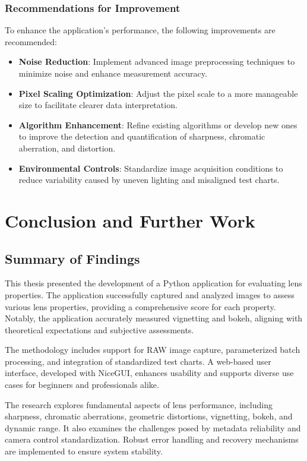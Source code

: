 \subsection{Recommendations for Improvement}
To enhance the application's performance, the following improvements are recommended:

\begin{itemize}
    \item \textbf{Noise Reduction}: Implement advanced image preprocessing techniques to minimize noise and enhance measurement accuracy.
    \item \textbf{Pixel Scaling Optimization}: Adjust the pixel scale to a more manageable size to facilitate clearer data interpretation.
    \item \textbf{Algorithm Enhancement}: Refine existing algorithms or develop new ones to improve the detection and quantification of sharpness, chromatic aberration, and distortion.
    \item \textbf{Environmental Controls}: Standardize image acquisition conditions to reduce variability caused by uneven lighting and misaligned test charts.
\end{itemize}

\chapter{Conclusion and Further Work}

\section{Summary of Findings}
This thesis presented the development of a Python application for evaluating lens properties. The application successfully captured and analyzed images to assess various lens properties, providing a comprehensive score for each property. Notably, the application accurately measured vignetting and bokeh, aligning with theoretical expectations and subjective assessments.

The methodology includes support for RAW image capture, parameterized batch processing, and integration of standardized test charts. A web-based user interface, developed with NiceGUI, enhances usability and supports diverse use cases for beginners and professionals alike.

The research explores fundamental aspects of lens performance, including sharpness, chromatic aberrations, geometric distortions, vignetting, bokeh, and dynamic range. It also examines the challenges posed by metadata reliability and camera control standardization. Robust error handling and recovery mechanisms are implemented to ensure system stability.

